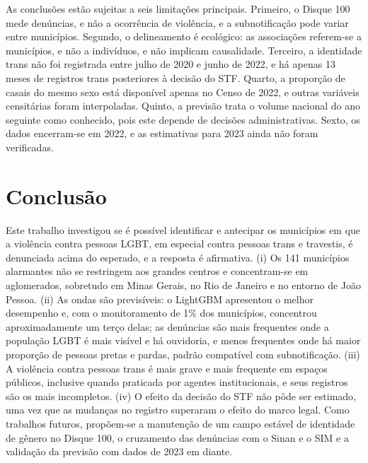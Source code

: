 \documentclass[12pt]{article}
\begin{document}
As conclusões estão sujeitas a seis limitações principais. Primeiro, o Disque 100 mede denúncias, e não a ocorrência de violência, e a subnotificação pode variar entre municípios. Segundo, o delineamento é ecológico: as associações referem-se a municípios, e não a indivíduos, e não implicam causalidade. Terceiro, a identidade trans não foi registrada entre julho de 2020 e junho de 2022, e há apenas 13 meses de registros trans posteriores à decisão do STF. Quarto, a proporção de casais do mesmo sexo está disponível apenas no Censo de 2022, e outras variáveis censitárias foram interpoladas. Quinto, a previsão trata o volume nacional do ano seguinte como conhecido, pois este depende de decisões administrativas. Sexto, os dados encerram-se em 2022, e as estimativas para 2023 ainda não foram verificadas.


\clearpage
\section{Conclusão}
\label{sec:conclusao}

Este trabalho investigou se é possível identificar e antecipar os municípios em que a violência contra pessoas LGBT, em especial contra pessoas trans e travestis, é denunciada acima do esperado, e a resposta é afirmativa. (i) Os 141 municípios alarmantes não se restringem aos grandes centros e concentram-se em aglomerados, sobretudo em Minas Gerais, no Rio de Janeiro e no entorno de João Pessoa. (ii) As ondas são previsíveis: o LightGBM apresentou o melhor desempenho e, com o monitoramento de 1\% dos municípios, concentrou aproximadamente um terço delas; as denúncias são mais frequentes onde a população LGBT é mais visível e há ouvidoria, e menos frequentes onde há maior proporção de pessoas pretas e pardas, padrão compatível com subnotificação. (iii) A violência contra pessoas trans é mais grave e mais frequente em espaços públicos, inclusive quando praticada por agentes institucionais, e seus registros são os mais incompletos. (iv) O efeito da decisão do STF não pôde ser estimado, uma vez que as mudanças no registro superaram o efeito do marco legal. Como trabalhos futuros, propõem-se a manutenção de um campo estável de identidade de gênero no Disque 100, o cruzamento das denúncias com o Sinan e o SIM e a validação da previsão com dados de 2023 em diante.


\clearpage


\end{document}
